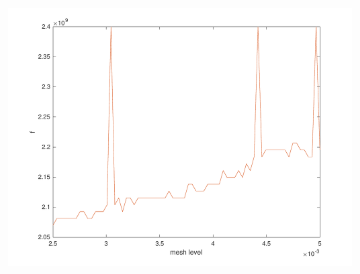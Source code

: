\documentclass[12pt,a4paper]{article}
\begin{document}
{\begin{figure}[h]
\begin{center}
\begin{subfigure}{0.3\linewidth}
				\includegraphics[scale=0.3]{F_vs_mesh_level.pdf}
				\caption{}
			\end{subfigure}
		\end{center}
	\end{figure}
}
\end{document}
